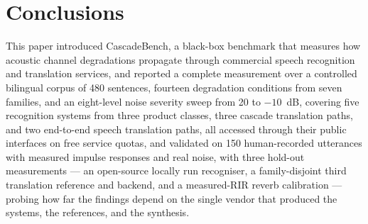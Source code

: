\section{Conclusions}
\label{sec:conclusions}

This paper introduced CascadeBench, a black-box benchmark that measures how
acoustic channel degradations propagate through commercial speech
recognition and translation services, and reported a complete measurement
over a controlled bilingual corpus of 480 sentences, fourteen degradation
conditions from seven families, and an eight-level noise severity sweep
from 20 to $-10$~dB, covering five recognition
systems from three product classes, three cascade translation paths,
and two end-to-end speech translation paths, all accessed through their
public interfaces on free service quotas, and validated on 150
human-recorded utterances with measured impulse responses and real noise,
with three hold-out measurements --- an open-source locally run recogniser,
a family-disjoint third translation reference and backend, and a
measured-RIR reverb calibration --- probing how far the findings depend on
the single vendor that produced the systems, the references, and the
synthesis.

